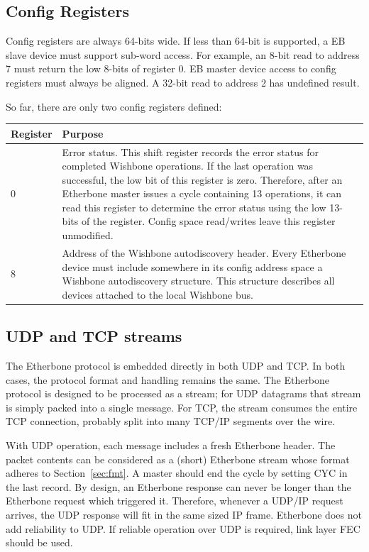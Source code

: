 \documentclass{article}
\begin{document}
\subsection{Config Registers}
\label{sec:config}

Config registers are always 64-bits wide.
If  less than 64-bit is supported,
a EB slave device must support sub-word access.
For example, an 8-bit read to address 7 must return the
low 8-bits of register 0.
EB master device access to config registers must always be aligned.
A 32-bit read to address 2 has undefined result.

So far, there are only two config registers defined:

\begin{tabular}{|l|p{}|}
\hline
Register & Purpose \\
\hline
0 &
Error status.
This shift register records the error status for completed Wishbone
operations.
If the last operation was successful,
the low bit of this register is zero.
Therefore, 
after an Etherbone master issues a cycle containing 13 operations,
it can read this register to determine the error status using the low
13-bits of the register.
Config space read/writes leave this register unmodified.
\\
\hline
8 &
Address of the Wishbone autodiscovery header.
Every Etherbone device must include somewhere in its config address space
a Wishbone autodiscovery structure.
This structure describes all devices attached to the local Wishbone bus.
\\
\hline
\end{tabular}

\subsection{UDP and TCP streams}

The Etherbone protocol is embedded directly in both UDP and TCP.
In both cases, the protocol format and handling remains the same.
The Etherbone protocol is designed to be processed as a stream;
for UDP datagrams that stream is simply packed into a single message.
For TCP, the stream consumes the entire TCP connection,
probably split into many TCP/IP segments over the wire.

With UDP operation,
each message includes a fresh Etherbone header.
The packet contents can be considered as a (short) Etherbone stream
whose format adheres to Section~\ref{sec:fmt}.
A master should end the cycle by setting CYC in the last record.
By design,
an Etherbone response can never be longer than the Etherbone request
which triggered it.
Therefore, whenever a UDP/IP request arrives, 
the UDP response will fit in the same sized IP frame.
Etherbone does not add reliability to UDP.
If reliable operation over UDP is required, 
link layer FEC should be used.
\end{document}
